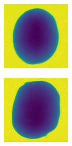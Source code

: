 \documentclass[11pt]{article}
\begin{document}
\begin{figure}[!h]
\begin{subfigure}[b]{0.22\textwidth}
         \caption{}
         \label{fig:perfect_21}
     \end{subfigure}
     \hfill
     \begin{subfigure}[b]{0.22\textwidth}
         \centering
         \includegraphics[width=\textwidth]{figurer/potato_dataset/perfect/perfect_22.jpg}
         \caption{}
         \label{fig:perfect_22}
     \end{subfigure}
     \hfill
     \begin{subfigure}[b]{0.22\textwidth}
         \centering
         \includegraphics[width=\textwidth]{figurer/potato_dataset/perfect/perfect_23.jpg}

\end{subfigure}
\end{figure}
\end{document}
